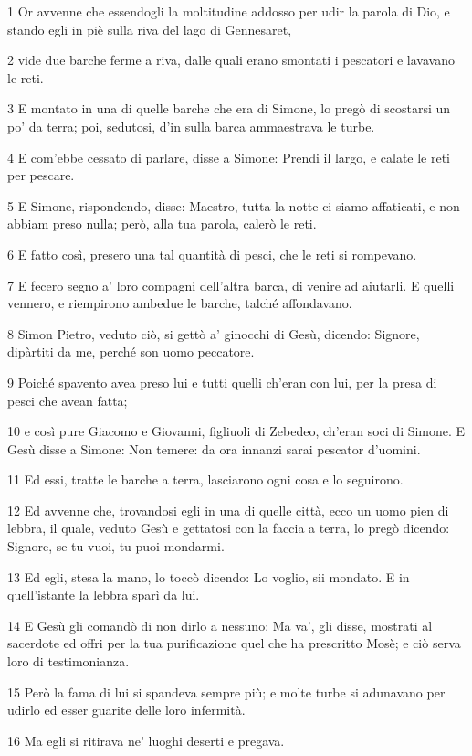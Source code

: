 \par 1 Or avvenne che essendogli la moltitudine addosso per udir la parola di Dio, e stando egli in piè sulla riva del lago di Gennesaret,
\par 2 vide due barche ferme a riva, dalle quali erano smontati i pescatori e lavavano le reti.
\par 3 E montato in una di quelle barche che era di Simone, lo pregò di scostarsi un po' da terra; poi, sedutosi, d'in sulla barca ammaestrava le turbe.
\par 4 E com'ebbe cessato di parlare, disse a Simone: Prendi il largo, e calate le reti per pescare.
\par 5 E Simone, rispondendo, disse: Maestro, tutta la notte ci siamo affaticati, e non abbiam preso nulla; però, alla tua parola, calerò le reti.
\par 6 E fatto così, presero una tal quantità di pesci, che le reti si rompevano.
\par 7 E fecero segno a' loro compagni dell'altra barca, di venire ad aiutarli. E quelli vennero, e riempirono ambedue le barche, talché affondavano.
\par 8 Simon Pietro, veduto ciò, si gettò a' ginocchi di Gesù, dicendo: Signore, dipàrtiti da me, perché son uomo peccatore.
\par 9 Poiché spavento avea preso lui e tutti quelli ch'eran con lui, per la presa di pesci che avean fatta;
\par 10 e così pure Giacomo e Giovanni, figliuoli di Zebedeo, ch'eran soci di Simone. E Gesù disse a Simone: Non temere: da ora innanzi sarai pescator d'uomini.
\par 11 Ed essi, tratte le barche a terra, lasciarono ogni cosa e lo seguirono.
\par 12 Ed avvenne che, trovandosi egli in una di quelle città, ecco un uomo pien di lebbra, il quale, veduto Gesù e gettatosi con la faccia a terra, lo pregò dicendo: Signore, se tu vuoi, tu puoi mondarmi.
\par 13 Ed egli, stesa la mano, lo toccò dicendo: Lo voglio, sii mondato. E in quell'istante la lebbra sparì da lui.
\par 14 E Gesù gli comandò di non dirlo a nessuno: Ma va', gli disse, mostrati al sacerdote ed offri per la tua purificazione quel che ha prescritto Mosè; e ciò serva loro di testimonianza.
\par 15 Però la fama di lui si spandeva sempre più; e molte turbe si adunavano per udirlo ed esser guarite delle loro infermità.
\par 16 Ma egli si ritirava ne' luoghi deserti e pregava.

